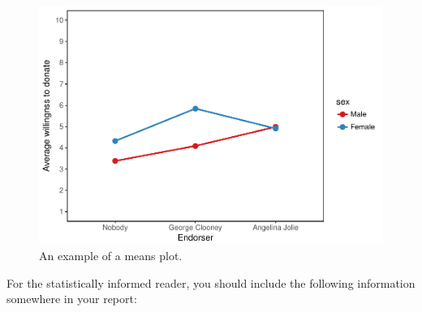 \documentclass[a4paper]{book}
\theoremstyle{definition}
\theoremstyle{definition}
\theoremstyle{definition}
\theoremstyle{remark}
\begin{document}
\begin{figure}[H]
\includegraphics[width=0.7\linewidth]{GentleIntro_files/figure-latex/2way-meansplot-1} \caption{An example of a means plot.}\label{fig:2way-meansplot}
\end{figure}

For the statistically informed reader, you should include the following
information somewhere in your report:
\end{document}
